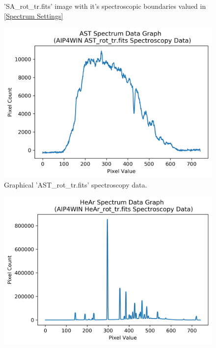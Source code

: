 \documentclass[12pt]{article}
\begin{document}
\begin{multicols}{3}
\begin{figure}[H]
  \caption{\label{SA Spectrum} 'SA\_rot\_tr.fits' image with it's spectroscopic boundaries valued in \cref{Spectrum Settings}}
\end{figure}
\end{multicols}

\begin{multicols}{3}
\centering
\begin{figure} [H]
  \centering
  \ContinuedFloat*
  \includegraphics[scale=0.4]{Images/AsImages/S4/AST/ASTPythonGraph.png}
  \caption{\label{AST Python Graph} Graphical {'AST\_rot\_tr.fits'} spectroscopy data.}
\end{figure}
\begin{figure}[H]
  \centering
  \ContinuedFloat
  \includegraphics[scale=0.4]{Images/AsImages/S4/HeAr/HeArPythonGraph.png}

\end{figure}
\end{multicols}
\end{document}
